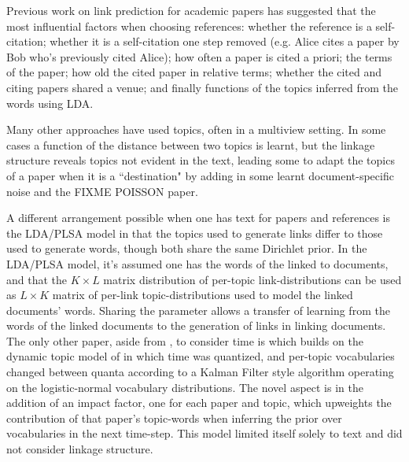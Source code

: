 Previous work on link prediction for academic papers has suggested\cite{Bethard2010} that the most influential factors when choosing references: whether the reference is a self-citation; whether it is a self-citation one step removed (e.g. Alice cites a paper by Bob who's previously cited Alice); how often a paper is cited a priori; the terms of the paper; how old the cited paper in relative terms; whether the cited and citing papers shared a venue; and finally functions of the topics inferred from the words using LDA\cite{Blei2003}.

Many other approaches have used topics, often in a multiview setting. In some cases a function of the distance between two topics is learnt\cite{Chang2009a}\cite{Chang2010a}, but the linkage structure reveals topics not evident in the text, leading some to adapt the topics of a paper when it is a ``destination" by adding in some learnt document-specific noise\cite{Neiswanger2014} and the FIXME POISSON paper.

A different arrangement possible when one has text for papers and references is the LDA/PLSA model\cite{Nallapati2008}\cite{Nallapati2008a} in that the topics used to generate links differ to those used to generate words, though both share the same Dirichlet prior. In the LDA/PLSA model, it's assumed one has the words of the linked to documents, and that the $K \times L$ matrix distribution of per-topic link-distributions can be used as $L \times K$ matrix of per-link topic-distributions used to model the linked documents' words. Sharing the parameter allows a transfer of learning from the words of the linked documents to the generation of links in linking documents.
The only other paper, aside from \cite{Bethard2010}, to consider time is \cite{Gerrish2010} which builds on the dynamic topic model of \cite{Blei2006a} in which time was quantized, and per-topic vocabularies changed between quanta according to a Kalman Filter style algorithm operating on the logistic-normal vocabulary distributions. The novel aspect is in the addition of an impact factor, one for each paper and topic, which upweights the contribution of that paper's topic-words when inferring the prior over vocabularies in the next time-step. This model limited itself solely to text and did not consider linkage structure.

